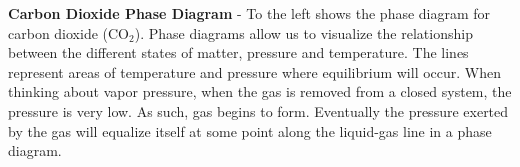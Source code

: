 \documentclass{article}
\begin{document}
\begin{minipage}{0.38\textwidth}
	\end{minipage}
	\begin{minipage}{0.67\textwidth}
		\textbf{Carbon Dioxide Phase Diagram} - To the left shows the phase diagram for carbon dioxide (CO$_2$). Phase diagrams allow us to visualize the relationship between the different states of matter, pressure and temperature. The lines represent areas of temperature and pressure where equilibrium will occur. When thinking about vapor pressure, when the gas is removed from a closed system, the pressure is very low. As such, gas begins to form. Eventually the pressure exerted by the gas will equalize itself at some point along the liquid-gas line in a phase diagram.  \\

\end{minipage}

\vspace{10pt}
\end{document}
